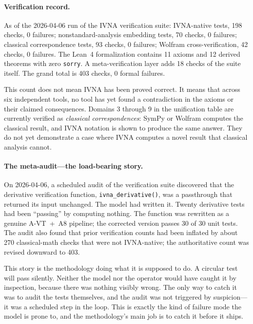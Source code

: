 \documentclass[12pt]{article}
\begin{document}
\paragraph{Verification record.} As of the 2026-04-06 run of the IVNA verification suite: IVNA-native tests, 198 checks, 0 failures; nonstandard-analysis embedding tests, 70 checks, 0 failures; classical correspondence tests, 93 checks, 0 failures; Wolfram cross-verification, 42 checks, 0 failures. The Lean~4 formalization contains 11 axioms and 12 derived theorems with zero \texttt{sorry}. A meta-verification layer adds 18 checks of the suite itself. The grand total is 403 checks, 0 formal failures.

This count does not mean IVNA has been proved correct. It means that across six independent tools, no tool has yet found a contradiction in the axioms or their claimed consequences. Domains 3 through 9 in the unification table are currently verified as \emph{classical correspondences}: SymPy or Wolfram computes the classical result, and IVNA notation is shown to produce the same answer. They do not yet demonstrate a case where IVNA computes a novel result that classical analysis cannot.

\paragraph{The meta-audit---the load-bearing story.} On 2026-04-06, a scheduled audit of the verification suite discovered that the derivative verification function, \texttt{ivna\_derivative()}, was a passthrough that returned its input unchanged. The model had written it. Twenty derivative tests had been ``passing'' by computing nothing. The function was rewritten as a genuine A-VT~+~A8 pipeline; the corrected version passes 30 of 30 unit tests. The audit also found that prior verification counts had been inflated by about 270 classical-math checks that were not IVNA-native; the authoritative count was revised downward to 403.

This story is the methodology doing what it is supposed to do. A circular test will pass silently. Neither the model nor the operator would have caught it by inspection, because there was nothing visibly wrong. The only way to catch it was to audit the tests themselves, and the audit was not triggered by suspicion---it was a scheduled step in the loop. This is exactly the kind of failure mode the model is prone to, and the methodology's main job is to catch it before it ships.
\end{document}
